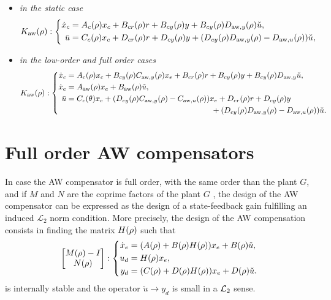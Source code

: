 \documentclass[fleqn,11pt]{article}
\begin{document}
\begin{itemize}
    \item \emph{in the static case}
        \begin{equation*}
            K_{\mathrm{aw}}(\rho):\left\{
                \begin{aligned}
                    \dot x_c &= A_c(\rho) x_c + B_{cr}(\rho)r + B_{cy}(\rho)y + B_{cy}(\rho)D_{\mathrm{aw},y}(\rho)\check{u},\\
                    \bar u &= C_c(\rho) x_c + D_{cr}(\rho)r + D_{cy}(\rho)y  +(D_{cy}(\rho)D_{\mathrm{aw},y}(\rho) - D_{\mathrm{aw},u}(\rho))\check{u},
                \end{aligned}
                \right.
        \end{equation*}
    \item \emph{in the low-order and full order cases}
        \begin{equation*}
            K_{\aw}(\p):\left\{
                \begin{aligned}
                    \dot x_c &= A_c(\p) x_c + B_{cy}(\p)\Cwy(\p) x_e + B_{cr}(\p)r + B_{cy}(\p)y + B_{cy}(\p)\Dwy\check{u},\\
                    \dot x_e &= \Aw(\p) x_e + \Bw(\p)\check{u},\\
                    \bar u &= C_c(\theta) x_c + (D_{cy}(\p)\Cwy(\p)-\Cwu(\p)) x_e + D_{cr}(\p)r + D_{cy}(\p)y  \\
                    &\hspace{6.5cm} +(D_{cy}(\p)\Dwy(\p)-\Dwu(\p))\check{u}.
                \end{aligned}
                \right.
        \end{equation*}
\end{itemize}

\section{Full order AW compensators}\label{sec:full}

In case the AW compensator is full order, \ie with the same order than the plant $G$, and if $M$ and $N$ are the coprime factors of the plant $G$ \citep{Xie2004}, the design of the AW compensator can be expressed as the design of a state-feedback gain fulfilling an induced $\mathcal{L}_2$ norm condition. More precisely, the design of the AW compensation consists in finding the matrix $H(\rho)$ such that
\begin{equation}\label{eq:sysCL_f}
    \begin{bmatrix} M(\rho)-I \\ N(\rho) \end{bmatrix}:
    \left\{
        \begin{aligned}
            \dot{x}_e &= (A(\rho)+B(\rho)H(\rho)) x_{e} + B(\rho)\check{u}, \\
                     u_d &= H(\rho) x_{e} ,\\
                     y_d &= (C(\rho)+D(\rho)H(\rho)) x_{e} + D(\rho)\check{u}.
        \end{aligned}\right.
\end{equation}
is internally stable and the operator $\check{u}\to y_d$ is small in a $\mathcal{L}_2$ sense.
\end{document}
